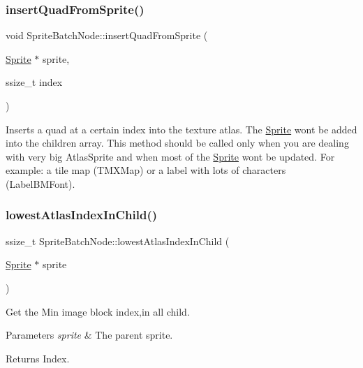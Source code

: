 \subsubsection{\texorpdfstring{insert\+Quad\+From\+Sprite()}{insertQuadFromSprite()}\hspace{0.1cm}{\footnotesize\ttfamily [2/2]}}
{\footnotesize\ttfamily void Sprite\+Batch\+Node\+::insert\+Quad\+From\+Sprite (\begin{DoxyParamCaption}\item[{\hyperlink{classSprite}{Sprite} $\ast$}]{sprite,  }\item[{ssize\+\_\+t}]{index }\end{DoxyParamCaption})}

Inserts a quad at a certain index into the texture atlas. The \hyperlink{classSprite}{Sprite} won\textquotesingle{}t be added into the children array. This method should be called only when you are dealing with very big Atlas\+Sprite and when most of the \hyperlink{classSprite}{Sprite} won\textquotesingle{}t be updated. For example\+: a tile map (T\+M\+X\+Map) or a label with lots of characters (Label\+B\+M\+Font). \mbox{\label{classSpriteBatchNode_aae2f59d34b31c69b731f13296129cf94}} 
\subsubsection{\texorpdfstring{lowest\+Atlas\+Index\+In\+Child()}{lowestAtlasIndexInChild()}\hspace{0.1cm}{\footnotesize\ttfamily [1/2]}}
{\footnotesize\ttfamily ssize\+\_\+t Sprite\+Batch\+Node\+::lowest\+Atlas\+Index\+In\+Child (\begin{DoxyParamCaption}\item[{\hyperlink{classSprite}{Sprite} $\ast$}]{sprite }\end{DoxyParamCaption})}

Get the Min image block index,in all child.


\begin{DoxyParams}{Parameters}
{\em sprite} & The parent sprite. \\
\hline
\end{DoxyParams}
\begin{DoxyReturn}{Returns}
Index. 
\end{DoxyReturn}
\mbox{\label{classSpriteBatchNode_aae2f59d34b31c69b731f13296129cf94}} 
